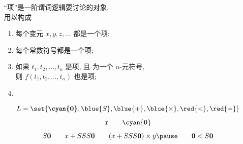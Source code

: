 \begin{frame}{}
  \begin{center}
    ``项''是一阶谓词逻辑要讨论的对象, \\
    用以构成 
  \end{center}

  \pause
  \begin{definition}[项 (Term)]
    \begin{enumerate}[(1)]
      \setlength{\itemsep}{8pt}
      \item 每个变元 $x, y, z, \dots$ 都是一个项;
      \item 每个常数符号都是一个项;
      \item 如果 $t_{1}, t_{2}, \dots, t_{n}$ 是项,
        且  为一个 $n$-元符号, \\
        则 $f(t_{1}, t_{2}, \dots, t_{n})$ 也是项;
      \item {}
    \end{enumerate}
  \end{definition}
  \[
    L = \set{\textbf{\cyan{0}}, \blue{S}, \blue{+}, \blue{\times}, \red{<}, \red{=}}
  \]
  \[
    x \qquad \cyan{\bf 0}
  \]
  \[
    S{\bf 0} \qquad x + SSS{\bf 0} \qquad (x + SSS{\bf 0}) \times y
    \pause \qquad {\bf 0} < S{\bf 0}
  \]
\end{frame}

